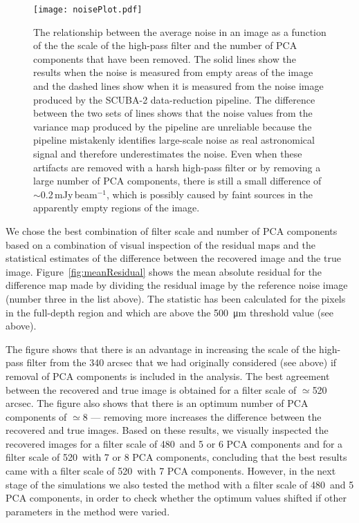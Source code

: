 \documentclass[a4paper,fleqn,usenatbib, twocolumn]{aastex63}
\begin{document}
\begin{figure}
  \centering
  \texttt{[image: noisePlot.pdf]}
  \caption{The relationship between the average noise in an image as a function of the
the scale of the 
high-pass filter and the number of PCA components that have been removed. The solid lines show the results when the noise
is measured from empty areas of the image and the dashed lines show when
it is measured from the noise image produced by the SCUBA-2 data-reduction
pipeline. The difference between the two sets of lines shows that the
noise values from the variance map produced by the pipeline are unreliable because the pipeline mistakenly
identifies large-scale noise as real astronomical signal and therefore underestimates the noise. Even when these artifacts are removed
with a harsh high-pass filter or by removing a large number of PCA components,
there is still a small difference of $\sim$0.2\,mJy\,beam$^{-1}$, which is
possibly caused by faint sources in the apparently empty regions of the image.
}
  \label{fig:noisePlot}
\end{figure}

We chose the best combination of filter scale and number of PCA components
based on a combination of visual inspection of the residual maps and the
statistical estimates of the difference between the recovered image and the
true image. Figure~\ref{fig:meanResidual} shows the mean absolute residual
for the difference map made by dividing the residual image by the reference noise image (number three
in the list above). The statistic has been calculated for the pixels
in the full-depth region and which are above the \SI{500}{\micro\meter} threshold value (see above).

The figure shows that there is an advantage in increasing the scale
of the high-pass filter from the 340 arcsec that we had originally
considered (see above) if removal of PCA components is included in
the analysis. The best agreement between the recovered and true image
is obtained for a filter scale of $\simeq$520 arcsec. The figure also
shows that there is an optimum number of PCA components of $\simeq$8 ---
removing more increases the difference between the recovered and true
images. Based on these results, we visually inspected the
recovered images for a filter scale of 480\arcsec\ and 5 or 6 PCA components and 
for a 
filter scale of 520\arcsec\ with 7 or 8 PCA components, concluding
that the best results came with a filter scale of 520\arcsec\ with 7 PCA components. 
However, in the next stage of the simulations we also tested
the method with a filter scale of 480\arcsec\ and 5 PCA components, in order to
check whether the optimum values shifted if other parameters in the method were varied.
\end{document}

